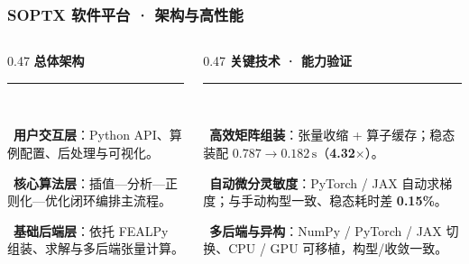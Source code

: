 \documentclass[notheorems]{beamer}
\begin{document}
	\begin{frame}
		\frametitle{SOPTX 软件平台 · 架构与高性能}

		\vspace{0.6em}

		\begin{columns}[t, totalwidth=\linewidth]

			\begin{column}{0.47\linewidth}
				{\fontsize{10}{12}\selectfont\bfseries\sffamily\color{structure.fg}总体架构}\\[3pt]
				{\color{structure.fg!35}\rule{\linewidth}{0.8pt}}\\[7pt]
				{\fontsize{8.5}{13.5}\selectfont\sffamily
					~\textbf{用户交互层}：Python API、算例配置、后处理与可视化。
					\par\vspace{8pt}
					~\textbf{核心算法层}：插值—分析—正则化—优化闭环编排主流程。
					\par\vspace{8pt}
					~\textbf{基础后端层}：依托 FEALPy 组装、求解与多后端张量计算。}
			\end{column}

			\hfill

			\begin{column}{0.47\linewidth}
				{\fontsize{10}{12}\selectfont\bfseries\sffamily\color{structure.fg}关键技术 · 能力验证}\\[3pt]
				{\color{structure.fg!35}\rule{\linewidth}{0.8pt}}\\[7pt]
				{\fontsize{8.5}{13.5}\selectfont\sffamily
					~\textbf{高效矩阵组装}：张量收缩 + 算子缓存；稳态装配 $0.787\!\to\!0.182\,\mathrm{s}$（\textbf{4.32$\times$}）。
					\par\vspace{8pt}
					~\textbf{自动微分灵敏度}：PyTorch / JAX 自动求梯度；与手动构型一致、稳态耗时差 \textbf{0.15\%}。
					\par\vspace{8pt}
					~\textbf{多后端与异构}：NumPy / PyTorch / JAX 切换、CPU / GPU 可移植，构型/收敛一致。}
			\end{column}

		\end{columns}


\end{frame}
\end{document}
